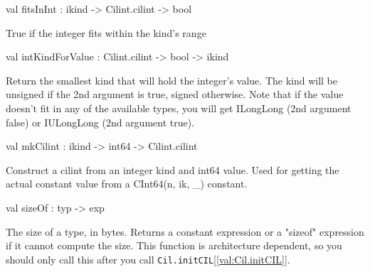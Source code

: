 \documentclass[11pt]{article}
\begin{document}
\label{val:Cil.fitsInInt}\begin{ocamldoccode}
val fitsInInt : ikind -> Cilint.cilint -> bool
\end{ocamldoccode}
\begin{ocamldocdescription}
True if the integer fits within the kind's range


\end{ocamldocdescription}




\label{val:Cil.intKindForValue}\begin{ocamldoccode}
val intKindForValue : Cilint.cilint -> bool -> ikind
\end{ocamldoccode}
\begin{ocamldocdescription}
Return the smallest kind that will hold the integer's value.  The
 kind will be unsigned if the 2nd argument is true, signed
 otherwise.  Note that if the value doesn't fit in any of the
 available types, you will get ILongLong (2nd argument false) or
 IULongLong (2nd argument true).


\end{ocamldocdescription}




\label{val:Cil.mkCilint}\begin{ocamldoccode}
val mkCilint : ikind -> int64 -> Cilint.cilint
\end{ocamldoccode}
\begin{ocamldocdescription}
Construct a cilint from an integer kind and int64 value. Used for
 getting the actual constant value from a CInt64(n, ik, \_)
 constant.


\end{ocamldocdescription}




\label{val:Cil.sizeOf}\begin{ocamldoccode}
val sizeOf : typ -> exp
\end{ocamldoccode}
\begin{ocamldocdescription}
The size of a type, in bytes. Returns a constant expression or a
 "sizeof" expression if it cannot compute the size. This function
 is architecture dependent, so you should only call this after you
 call {\tt{Cil.initCIL}}[\ref{val:Cil.initCIL}].


\end{ocamldocdescription}
\end{document}
